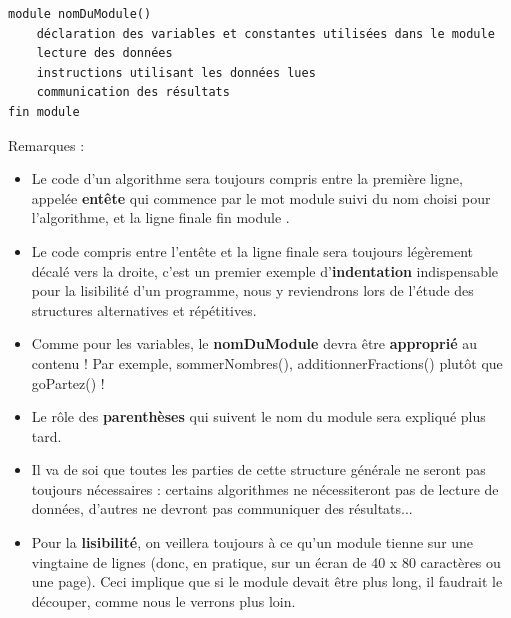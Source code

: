 \documentclass[11pt,a4paper]{article}
\begin{document}
            \par
        \begin{verbatim}
module nomDuModule()
    déclaration des variables et constantes utilisées dans le module
    lecture des données
    instructions utilisant les données lues
    communication des résultats
fin module
				\end{verbatim}
          Remarques :
          
					\begin{itemize}
				
			\item Le code d'un algorithme sera toujours compris entre la premi\`ere ligne, 
            appel\'ee \guillemotleft  \textbf{ent\^ete} \guillemotright  qui commence par le mot \guillemotleft  module \guillemotright  suivi du nom choisi pour l'algorithme,
            et la ligne finale \guillemotleft  fin module \guillemotright .
            
			\item Le code compris entre l'ent\^ete et la ligne finale sera toujours l\'eg\`erement d\'ecal\'e vers la droite, 
              c'est un premier exemple d'\textbf{indentation} indispensable pour la lisibilit\'e d'un programme, 
              nous y reviendrons lors de l'\'etude des structures alternatives et r\'ep\'etitives.
            
			\item Comme pour les variables, le \textbf{nomDuModule} 
            devra \^etre \textbf{appropri\'e} au contenu ! 
            Par exemple, sommerNombres(), additionnerFractions() plut\^ot que goPartez() ! 
            
			\item Le r\^ole des \textbf{parenth\`eses} qui suivent le nom du module sera expliqu\'e plus tard.
			\item Il va de soi que toutes les parties de cette structure g\'en\'erale ne seront pas toujours 
            n\'ecessaires : certains algorithmes ne n\'ecessiteront pas de lecture de donn\'ees, d'autres 
            ne devront pas communiquer des r\'esultats...
            
			\item Pour la \textbf{lisibilit\'e}, 
            on veillera toujours \`a ce qu'un module tienne sur une vingtaine de 
            lignes (donc, en pratique, sur un \'ecran de 40 x 80 caract\`eres ou une page). Ceci implique 
            que si le module devait \^etre plus long, il faudrait le d\'ecouper, comme nous le verrons 
            plus loin.
            
					\end{itemize}
				
\end{document}
